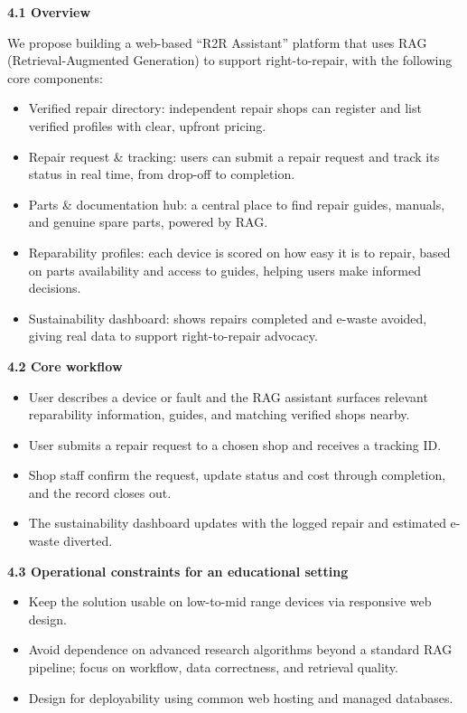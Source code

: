 \documentclass[11pt]{article}
\newcommand{\sechead}[2]{%
  \vspace{0.35cm}\noindent
  {\large\bfseries #1}\hfill{\large\itshape #2}\par
  \vspace{0.15cm}
}
\newcommand{\secheadonly}[1]{%
  \vspace{0.35cm}\noindent
  {\large\bfseries #1}\par
  \vspace{0.15cm}
}
\begin{document}
\sechead{4.1 Overview}{}
We propose building a web-based ``R2R Assistant'' platform that uses RAG (Retrieval-Augmented Generation) to support right-to-repair, with the following core components:
\begin{itemize}
  \item Verified repair directory: independent repair shops can register and list verified profiles with clear, upfront pricing.
  \item Repair request \& tracking: users can submit a repair request and track its status in real time, from drop-off to completion.
  \item Parts \& documentation hub: a central place to find repair guides, manuals, and genuine spare parts, powered by RAG.
  \item Reparability profiles: each device is scored on how easy it is to repair, based on parts availability and access to guides, helping users make informed decisions.
  \item Sustainability dashboard: shows repairs completed and e-waste avoided, giving real data to support right-to-repair advocacy.
\end{itemize}
\secheadonly{4.2 Core workflow}
\begin{itemize}
  \item User describes a device or fault and the RAG assistant surfaces relevant reparability information, guides, and matching verified shops nearby.
  \item User submits a repair request to a chosen shop and receives a tracking ID.
  \item Shop staff confirm the request, update status and cost through completion, and the record closes out.
  \item The sustainability dashboard updates with the logged repair and estimated e-waste diverted.
\end{itemize}

\secheadonly{4.3 Operational constraints for an educational setting}
\begin{itemize}
  \item Keep the solution usable on low-to-mid range devices via responsive web design.
  \item Avoid dependence on advanced research algorithms beyond a standard RAG pipeline; focus on workflow, data correctness, and retrieval quality.
  \item Design for deployability using common web hosting and managed databases.
\end{itemize}
\end{document}
